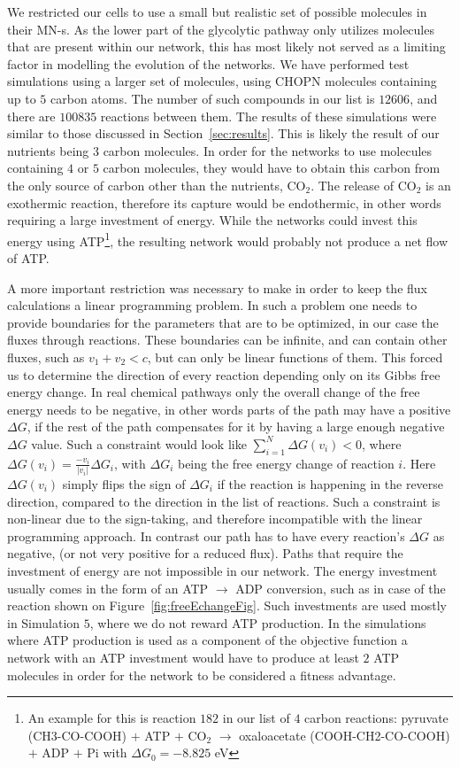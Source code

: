 \documentclass[a4paper,12pt]{article}
\begin{document}
We restricted our cells to use a small but realistic set of possible molecules in their MN-s. As the lower part of the glycolytic pathway only utilizes molecules that are present within our network, this has most likely not served as a limiting factor in modelling the evolution of the networks. We have performed test simulations using a larger set of molecules, using CHOPN molecules containing up to $5$ carbon atoms. The number of such compounds in our list is $12606$, and there are $100 835$ reactions between them. The results of these simulations were similar to those discussed in Section~\ref{sec:results}. This is likely the result of our nutrients being $3$ carbon molecules. In order for the networks to use molecules containing $4$ or $5$ carbon molecules, they would have to obtain this carbon from the only source of carbon other than the nutrients, CO$_2$. The release of CO$_2$ is an exothermic reaction, therefore its capture would be endothermic, in other words requiring a large investment of energy. While the networks could invest this energy using ATP\footnote{ An example for this is reaction $182$ in our list of $4$ carbon reactions: pyruvate (CH3-CO-COOH) $+$ ATP $+$ CO$_2$ $\rightarrow$  oxaloacetate (COOH-CH2-CO-COOH) $+$ ADP $+$ Pi with $\Delta G_0=-8.825$ eV}, the resulting network would probably not produce a net flow of ATP. 

A more important restriction was necessary to make in order to keep the flux calculations a linear programming problem. In such a problem one needs to provide boundaries for the parameters that are to be optimized, in our case the fluxes through reactions. These boundaries can be infinite, and can contain other fluxes, such as $v_1+v_2 < c$, but can only be linear functions of them. This forced us to determine the direction of every reaction depending only on its Gibbs free energy change. In real chemical pathways only the overall change of the free energy needs to be negative, in other words parts of the path may have a positive $\Delta G$, if the rest of the path compensates for it by having a large enough negative $\Delta G$ value. Such a constraint would look like $\sum_{i=1}^N \Delta G \left( v_i \right)<0$, where $\Delta G \left( v_i \right)=\frac{-v_i}{|v_i|} \Delta G_i$, with $\Delta G_i$ being the free energy change of reaction $i$. Here $\Delta G \left( v_i \right)$ simply flips the sign of $\Delta G_i$ if the reaction is happening in the reverse direction, compared to the direction in the list of reactions. Such a constraint is non-linear due to the sign-taking, and therefore incompatible with the linear programming approach. In contrast our path has to have every reaction's $\Delta G$ as negative, (or not very positive for a reduced flux).
Paths that require the investment of energy are not impossible in our network. The energy investment usually comes in the form of an ATP $\rightarrow$ ADP conversion, such as in case of the reaction shown on Figure~\ref{fig:freeEchangeFig}. Such investments are used mostly in Simulation $5$, where we do not reward ATP production. In the simulations where ATP production is used as a component of the objective function a network with an ATP investment would have to produce at least $2$ ATP molecules in order for the network to be considered a fitness advantage.  
\end{document}
